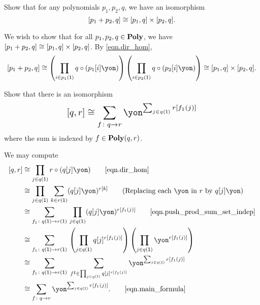 \documentclass[Book-Poly]{subfiles}
\begin{document}
\begin{exercise}\label{exc.sum_times_closure}
Show that for any polynomials $p_1,p_2,q$, we have an isomorphism
\[
[p_1 + p_2, q] \cong [p_1, q] \times [p_2, q].
\]
\begin{solution}
We wish to show that for all $p_1, p_2, q \in \mathbf{Poly}$, we have $[p_1 + p_2, q] \cong [p_1, q] \times [p_2, q]$.
By \eqref{eqn.dir_hom},
\[
    \ihom{p_1 + p_2, q} \iso \left(\prod_{i \in p_1(\1)} q \circ (p_1[i]\yon)\right) \left(\prod_{i \in p_2(\1)} q \circ (p_2[i]\yon)\right) \iso \ihom{p_1, q} \times \ihom{p_2, q}.
\]
\end{solution}
\end{exercise}

\begin{exercise} \label{exc.dir_hom_sum}
Show that there is an isomorphism
\begin{equation} \label{eqn.dir_hom_sum}
\scalebox{1.3}{$\displaystyle
\ihom{q,r} \iso \sum_{f\colon q\to r}\yon^{\sum_{j\in q(\1)}r[f_1(j)]}
$}
\end{equation}
where the sum is indexed by $f\in\mathbf{Poly}(q,r)$.
\begin{solution}
We may compute
\begin{align*}
    \ihom{q, r} &\iso \prod_{j \in q(\1)} r \circ (q[j]\yon) \tag*{\eqref{eqn.dir_hom}} \\
    &\iso \prod_{j \in q(\1)} \, \sum_{k \in r(\1)} (q[j]\yon)^{r[k]} \tag{Replacing each $\yon$ in $r$ by $q[j]\yon$} \\
    &\iso \sum_{f_1 \colon q(\1) \to r(\1)} \, \prod_{j \in q(\1)} (q[j]\yon)^{r[f_1(j)]} \tag*{\eqref{eqn.push_prod_sum_set_indep}} \\
    &\iso \sum_{f_1 \colon q(\1) \to r(\1)} \, \left(\prod_{j \in q(\1)} q[j]^{r[f_1(j)]} \right)\left(\prod_{j \in q(\1)} \yon^{r[f_1(j)]} \right) \\
    &\iso \sum_{f_1 \colon q(\1) \to r(\1)} \; \sum_{f^\sharp \in \prod_{j \in q(\1)} q[j]^{r[f_1(j)]}} \yon^{\sum_{j \in q(\1)} r[f_1(j)]} \\
    &\iso \sum_{f \colon q \to r} \yon^{\sum_{j \in q(\1)} r[f_1(j)]}. \tag*{\eqref{eqn.main_formula}}
\end{align*}
\end{solution}
\end{exercise}
\end{document}
